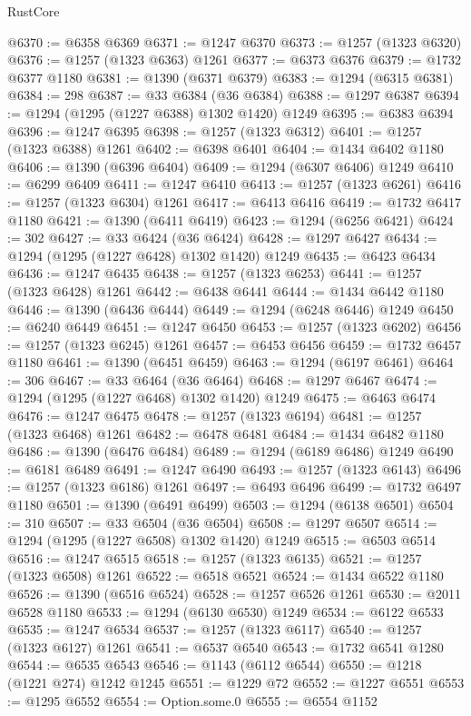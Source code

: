 \begin{lexlean}{RustCore}
\begin{coremodule}
@6370 := @6358 @6369
@6371 := @1247 @6370
@6373 := @1257 (@1323 @6320)
@6376 := @1257 (@1323 @6363) @1261
@6377 := @6373 @6376
@6379 := @1732 @6377 @1180
@6381 := @1390 (@6371 @6379)
@6383 := @1294 (@6315 @6381)
@6384 := 298
@6387 := @33 @6384 (@36 @6384)
@6388 := @1297 @6387
@6394 := @1294 (@1295 (@1227 @6388) @1302 @1420) @1249
@6395 := @6383 @6394
@6396 := @1247 @6395
@6398 := @1257 (@1323 @6312)
@6401 := @1257 (@1323 @6388) @1261
@6402 := @6398 @6401
@6404 := @1434 @6402 @1180
@6406 := @1390 (@6396 @6404)
@6409 := @1294 (@6307 @6406) @1249
@6410 := @6299 @6409
@6411 := @1247 @6410
@6413 := @1257 (@1323 @6261)
@6416 := @1257 (@1323 @6304) @1261
@6417 := @6413 @6416
@6419 := @1732 @6417 @1180
@6421 := @1390 (@6411 @6419)
@6423 := @1294 (@6256 @6421)
@6424 := 302
@6427 := @33 @6424 (@36 @6424)
@6428 := @1297 @6427
@6434 := @1294 (@1295 (@1227 @6428) @1302 @1420) @1249
@6435 := @6423 @6434
@6436 := @1247 @6435
@6438 := @1257 (@1323 @6253)
@6441 := @1257 (@1323 @6428) @1261
@6442 := @6438 @6441
@6444 := @1434 @6442 @1180
@6446 := @1390 (@6436 @6444)
@6449 := @1294 (@6248 @6446) @1249
@6450 := @6240 @6449
@6451 := @1247 @6450
@6453 := @1257 (@1323 @6202)
@6456 := @1257 (@1323 @6245) @1261
@6457 := @6453 @6456
@6459 := @1732 @6457 @1180
@6461 := @1390 (@6451 @6459)
@6463 := @1294 (@6197 @6461)
@6464 := 306
@6467 := @33 @6464 (@36 @6464)
@6468 := @1297 @6467
@6474 := @1294 (@1295 (@1227 @6468) @1302 @1420) @1249
@6475 := @6463 @6474
@6476 := @1247 @6475
@6478 := @1257 (@1323 @6194)
@6481 := @1257 (@1323 @6468) @1261
@6482 := @6478 @6481
@6484 := @1434 @6482 @1180
@6486 := @1390 (@6476 @6484)
@6489 := @1294 (@6189 @6486) @1249
@6490 := @6181 @6489
@6491 := @1247 @6490
@6493 := @1257 (@1323 @6143)
@6496 := @1257 (@1323 @6186) @1261
@6497 := @6493 @6496
@6499 := @1732 @6497 @1180
@6501 := @1390 (@6491 @6499)
@6503 := @1294 (@6138 @6501)
@6504 := 310
@6507 := @33 @6504 (@36 @6504)
@6508 := @1297 @6507
@6514 := @1294 (@1295 (@1227 @6508) @1302 @1420) @1249
@6515 := @6503 @6514
@6516 := @1247 @6515
@6518 := @1257 (@1323 @6135)
@6521 := @1257 (@1323 @6508) @1261
@6522 := @6518 @6521
@6524 := @1434 @6522 @1180
@6526 := @1390 (@6516 @6524)
@6528 := @1257 @6526 @1261
@6530 := @2011 @6528 @1180
@6533 := @1294 (@6130 @6530) @1249
@6534 := @6122 @6533
@6535 := @1247 @6534
@6537 := @1257 (@1323 @6117)
@6540 := @1257 (@1323 @6127) @1261
@6541 := @6537 @6540
@6543 := @1732 @6541 @1280
@6544 := @6535 @6543
@6546 := @1143 (@6112 @6544)
@6550 := @1218 (@1221 @274) @1242 @1245
@6551 := @1229 @72
@6552 := @1227 @6551
@6553 := @1295 @6552
@6554 := Option.some.{0}
@6555 := @6554 @1152

\end{coremodule}
\end{lexlean}
